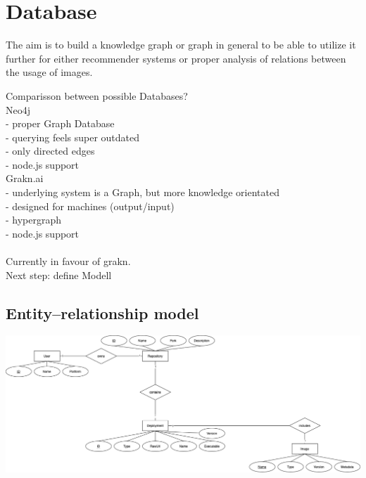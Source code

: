 \section{Database}
The aim is to build a knowledge graph or graph in general to be able to utilize it further for either recommender systems or proper analysis of relations between the usage of images.

Comparisson between possible Databases?\\

Neo4j\\
- proper Graph Database\\
- querying feels super outdated\\
- only directed edges\\
- node.js support\\

Grakn.ai\\
- underlying system is a Graph, but more knowledge orientated\\
- designed for machines (output/input)\\
- hypergraph\\
- node.js support\\
\\
Currently in favour of grakn.\\
Next step: define Modell\\
\subsection{Entity–relationship model}
\includegraphics[width=1.2\paperwidth,height=1.2\paperheight,keepaspectratio,angle=270]{graphics/er_database.png}